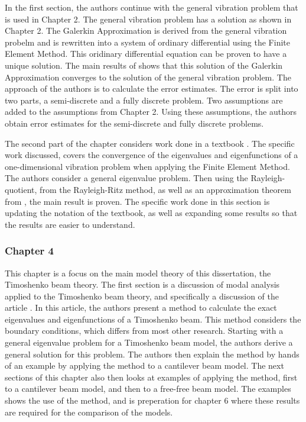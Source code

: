 \documentclass[../main.tex]{subfiles}
\begin{document}
In the first section, the authors continue with the general vibration problem that is used in Chapter 2. The general vibration problem has a solution as shown in Chapter 2. The Galerkin Approximation is derived from the general vibration probelm and is rewritten into a system of ordinary differential using the Finite Element Method. This oridinary differential equation can be proven to have a unique solution. The main results of \cite{BV13} shows that this solution of the Galerkin Approximation converges to the solution of the general vibration problem. The approach of the authors is to calculate the error estimates. The error is split into two parts, a semi-discrete and a fully discrete problem. Two assumptions are added to the assumptions from Chapter 2. Using these assumptions, the authors obtain error estimates for the semi-discrete and fully discrete problems.

The second part of the chapter considers work done in a textbook \cite{SF97}. The specific work discussed, covers the convergence of the eigenvalues and eigenfunctions of a one-dimensional vibration problem when applying the Finite Element Method. The authors consider a general eigenvalue problem. Then using the Rayleigh-quotient, from the Rayleigh-Ritz method, as well as an approximation theorem from \cite{OR97}, the main result is proven. The specific work done in this section is updating the notation of the textbook, as well as expanding some results so that the results are easier to understand.

\subsubsection{Chapter 4}
This chapter is a focus on the main model theory of this dissertation, the Timoshenko beam theory. The first section is a discussion of modal analysis applied to the Timoshenko beam theory, and specifically a discussion of the article \cite{VV06}. In this article, the authors present a method to calculate the exact eigenvalues and eigenfunctions of a Timoshenko beam. This method considers the boundary conditions, which differs from most other research. Starting with a general eigenvalue problem for a Timoshenko beam model, the authors derive a general solution for this problem. The authors then explain the method by hands of an example by applying the method to a cantilever beam model. The next sections of this chapter also then looks at examples of applying the method, first to a cantilever beam model, and then to a free-free beam model. The examples shows the use of the method, and is preperation for chapter 6 where these results are required for the comparison of the models. 
\end{document}
